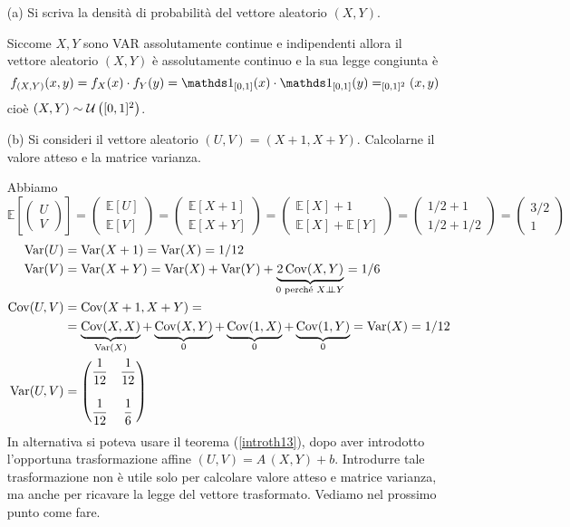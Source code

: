 \Soluzione{}
\begin{enumerate}
\item [(a)] Si scriva la densità di probabilità del vettore aleatorio $(X,Y)$.

Siccome $X,Y$ sono VAR assolutamente continue e indipendenti allora il vettore aleatorio $(X,Y)$ è assolutamente continuo e la sua legge congiunta è
\[
\fXYxy=f_X(x)\cdot f_Y(y)=\Ind_{[0,1]}(x)\cdot \Ind_{[0,1]}(y)=_{[0,1]^2}(x,y)
\]
cioè $(X,Y)\sim\mathcal{U}\left([0,1]^2\right)$.

\item [(b)] Si consideri il vettore aleatorio $(U,V)=(X+1,X+Y)$. Calcolarne il valore atteso e la matrice varianza.

Abbiamo
\[
\mathbb{E}\left[\begin{pmatrix}
U \\ V
\end{pmatrix}\right] =
\begin{pmatrix}
\mathbb{E}[U] \\ \mathbb{E}[V]
\end{pmatrix} = 
\begin{pmatrix}
\mathbb{E}[X+1] \\ \mathbb{E}[X+Y]
\end{pmatrix} = 
\begin{pmatrix}
\mathbb{E}[X]+1 \\ \mathbb{E}[X] +\mathbb{E}[Y]
\end{pmatrix} =
\begin{pmatrix}
1/2+1 \\ 1/2+1/2
\end{pmatrix} = 
\begin{pmatrix}
3/2 \\ 1
\end{pmatrix}
\]
\begin{gather*}
\begin{aligned}
\operatorname{Var}(U)&=\operatorname{Var}(X+1)=\operatorname{Var}(X)=1/12 \\
\operatorname{Var}(V)&=\operatorname{Var}(X+Y)=\operatorname{Var}(X)+\operatorname{Var}(Y)+\underbrace{2\operatorname{Cov}(X,Y)}_{0\text{ perché }X\perp \!\!\! \perp Y}=1/6 \\
\operatorname{Cov}(U,V)&=\operatorname{Cov}(X+1,X+Y)=\\
&=\underbrace{\operatorname{Cov}(X,X)}_{\operatorname{Var}(X)}+\underbrace{\operatorname{Cov}(X,Y)}_{0}+\underbrace{\operatorname{Cov}(1,X)}_{0}+\underbrace{\operatorname{Cov}(1,Y)}_{0}=\operatorname{Var}(X)=1/12 \\
\operatorname{Var}(U,V)&=\begin{pmatrix}
 \dfrac{1}{12}& \dfrac{1}{12} \\
\, & \, \\
\dfrac{1}{12} &\dfrac{1}{6}  \\
\end{pmatrix}  
\end{aligned}
\end{gather*}
In alternativa si poteva usare il teorema (\ref{introth13}), dopo aver introdotto l'opportuna trasformazione affine $(U,V)=A\,(X,Y)+b$. Introdurre tale trasformazione non è utile solo per calcolare valore atteso e matrice varianza, ma anche per ricavare la legge del vettore trasformato. Vediamo nel prossimo punto come fare.


\end{enumerate}
